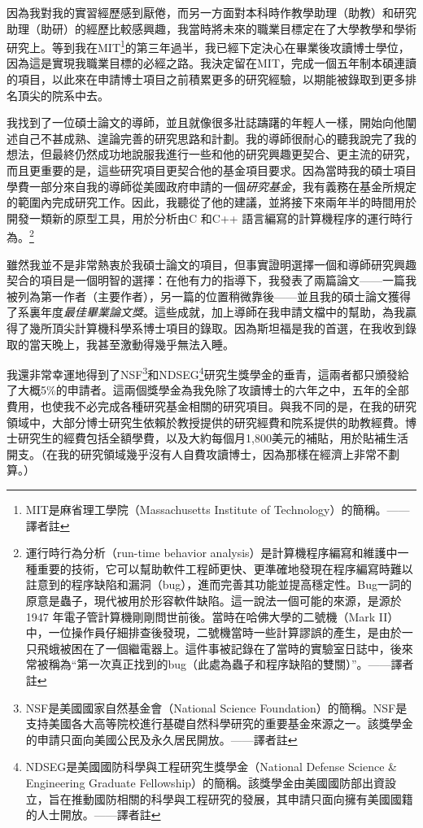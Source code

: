 \documentclass[12pt,UTF8,nofonts]{book}
\begin{document}
因為我對我的實習經歷感到厭倦，而另一方面對本科時作教學助理（助教）和研究助理（助研）的經歷比較感興趣，我當時將未來的職業目標定在了大學教學和學術研究上。等到我在MIT\footnote{MIT是麻省理工學院（Massachusetts Institute of Technology）的簡稱。——譯者註}的第三年過半，我已經下定決心在畢業後攻讀博士學位，因為這是實現我職業目標的必經之路。我決定留在MIT，完成一個五年制本碩連讀的項目，以此來在申請博士項目之前積累更多的研究經驗，以期能被錄取到更多排名頂尖的院系中去。

我找到了一位碩士論文的導師，並且就像很多壯誌躊躇的年輕人一樣，開始向他闡述自己不甚成熟、遑論完善的研究思路和計劃。我的導師很耐心的聽我說完了我的想法，但最終仍然成功地說服我進行一些和他的研究興趣更契合、更主流的研究，而且更重要的是，這些研究項目更契合他的基金項目要求。因為當時我的碩士項目學費一部分來自我的導師從美國政府申請的一個\emph{研究基金}，我有義務在基金所規定的範圍內完成研究工作。因此，我聽從了他的建議，並將接下來兩年半的時間用於開發一類新的原型工具，用於分析由C 和C++ 語言編寫的計算機程序的運行時行為。\footnote{運行時行為分析（run-time behavior analysis）是計算機程序編寫和維護中一種重要的技術，它可以幫助軟件工程師更快、更準確地發現在程序編寫時難以註意到的程序缺陷和漏洞（bug），進而完善其功能並提高穩定性。Bug一詞的原意是蟲子，現代被用於形容軟件缺陷。這一說法一個可能的來源，是源於1947 年電子管計算機剛剛問世前後。當時在哈佛大學的二號機（Mark II）中，一位操作員仔細排查後發現，二號機當時一些計算謬誤的產生，是由於一只飛蛾被困在了一個繼電器上。這件事被記錄在了當時的實驗室日誌中，後來常被稱為“第一次真正找到的bug（此處為蟲子和程序缺陷的雙關）”。——譯者註}

雖然我並不是非常熱衷於我碩士論文的項目，但事實證明選擇一個和導師研究興趣契合的項目是一個明智的選擇：在他有力的指導下，我發表了兩篇論文——一篇我被列為第一作者（主要作者），另一篇的位置稍微靠後——並且我的碩士論文獲得了系裏年度\emph{最佳畢業論文獎}。這些成就，加上導師在我申請文檔中的幫助，為我贏得了幾所頂尖計算機科學系博士項目的錄取。因為斯坦福是我的首選，在我收到錄取的當天晚上，我甚至激動得幾乎無法入睡。

我還非常幸運地得到了NSF\footnote{NSF是美國國家自然基金會（National Science Foundation）的簡稱。NSF是支持美國各大高等院校進行基礎自然科學研究的重要基金來源之一。該獎學金的申請只面向美國公民及永久居民開放。——譯者註}和NDSEG\footnote{NDSEG是美國國防科學與工程研究生獎學金（National Defense Science \& Engineering  Graduate Fellowship）的簡稱。該獎學金由美國國防部出資設立，旨在推動國防相關的科學與工程研究的發展，其申請只面向擁有美國國籍的人士開放。——譯者註}研究生獎學金的垂青，這兩者都只頒發給了大概5\%的申請者。這兩個獎學金為我免除了攻讀博士的六年之中，五年的全部費用，也使我不必完成各種研究基金相關的研究項目。與我不同的是，在我的研究領域中，大部分博士研究生依賴於教授提供的研究經費和院系提供的助教經費。博士研究生的經費包括全額學費，以及大約每個月1,800美元的補貼，用於貼補生活開支。（在我的研究領域幾乎沒有人自費攻讀博士，因為那樣在經濟上非常不劃算。）
\end{document}
